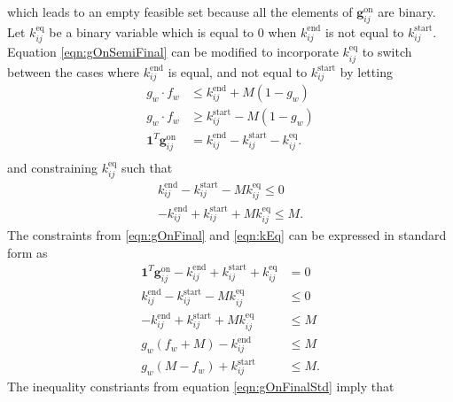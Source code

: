 which leads to an empty feasible set because all the elements of $\mathbf{g}_{ij}^{\text{on}}$ are binary. Let $k_{ij}^{\text{eq}}$ be a binary variable which is equal to $0$ when $k_{ij}^{\text{end}}$ is not equal to $k_{ij}^{\text{start}}$. Equation \eqref{eqn:gOnSemiFinal} can be modified to incorporate $k_{ij}^{\text{eq}}$ to switch between the cases where $k_{ij}^{\text{end}}$ is equal, and not equal to $k_{ij}^{\text{start}}$ by letting 
\begin{equation} \label{eqn:gOnFinal}\begin{aligned}
	g_w\cdot f_w &\le k^{\text{end}}_{ij} + M(1 - g_w) \\
	g_w\cdot f_w &\ge k^{\text{start}}_{ij} - M(1 - g_w) \\ 
	\mathbf{1}^T\mathbf{g}_{ij}^{\text{on}} &= k_{ij}^{\text{end}} - k_{ij}^{\text{start}} - k_{ij}^{\text{eq}}.\\
\end{aligned} \end{equation} 
 and constraining $k_{ij}^{\text{eq}}$ such that 
\begin{equation}\label{eqn:kEq}\begin{aligned}
	k_{ij}^{\text{end}} - k_{ij}^{\text{start}} - M k_{ij}^{\text{eq}} \le 0 \\
	-k_{ij}^{\text{end}} + k_{ij}^{\text{start}} + M k_{ij}^{\text{eq}} \le M .
\end{aligned}\end{equation}
The constraints from \eqref{eqn:gOnFinal} and \eqref{eqn:kEq} can be expressed in standard form as 
\begin{equation} \label{eqn:gOnFinalStd}\begin{aligned}
	\mathbf{1}^T\mathbf{g}_{ij}^{\text{on}} - k_{ij}^{\text{end}} + k_{ij}^{\text{start}} + k_{ij}^{\text{eq}} &=  0 \\
	k_{ij}^{\text{end}} - k_{ij}^{\text{start}} - M k_{ij}^{\text{eq}} &\le 0 \\
	-k_{ij}^{\text{end}} + k_{ij}^{\text{start}} + M k_{ij}^{\text{eq}} &\le M \\
	g_w\left (f_w + M \right) - k_{ij}^{\text{end}} &\le M \\
	g_w\left (M - f_w\right) + k_{ij}^{\text{start}} &\le M.
\end{aligned}\end{equation}
The inequality constriants from equation \ref{eqn:gOnFinalStd} imply that
